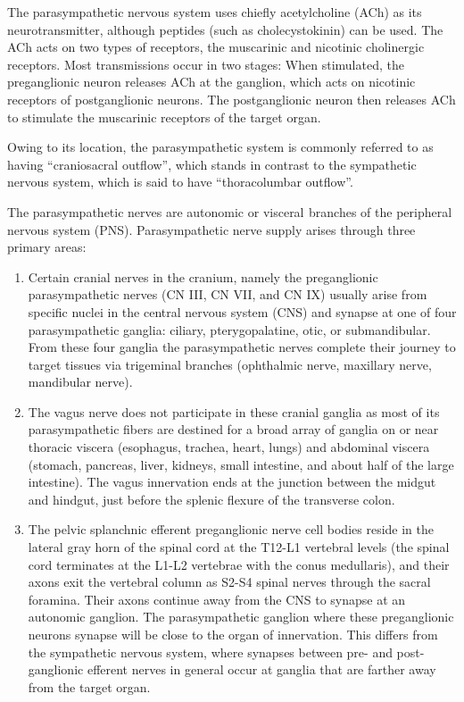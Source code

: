 The parasympathetic nervous system uses chiefly acetylcholine (ACh) as its neurotransmitter, although peptides (such as cholecystokinin) can be used. The ACh acts on two types of receptors, the muscarinic and nicotinic cholinergic receptors. Most transmissions occur in two stages: When stimulated, the preganglionic neuron releases ACh at the ganglion, which acts on nicotinic receptors of postganglionic neurons. The postganglionic neuron then releases ACh to stimulate the muscarinic receptors of the target organ.

Owing to its location, the parasympathetic system is commonly referred to as having ``craniosacral outflow'', which stands in contrast to the sympathetic nervous system, which is said to have ``thoracolumbar outflow''.

The parasympathetic nerves are autonomic or visceral  branches of the peripheral nervous system (PNS). Parasympathetic nerve supply arises through three primary areas:

\begin{enumerate}
\def\labelenumi{\arabic{enumi}.}
\tightlist
\item
  Certain cranial nerves in the cranium, namely the preganglionic parasympathetic nerves (CN III, CN VII, and CN IX) usually arise from specific nuclei in the central nervous system (CNS) and synapse at one of four parasympathetic ganglia: ciliary, pterygopalatine, otic, or submandibular. From these four ganglia the parasympathetic nerves complete their journey to target tissues via trigeminal branches (ophthalmic nerve, maxillary nerve, mandibular nerve).
\item
  The vagus nerve does not participate in these cranial ganglia as most of its parasympathetic fibers are destined for a broad array of ganglia on or near thoracic viscera (esophagus, trachea, heart, lungs) and abdominal viscera (stomach, pancreas, liver, kidneys, small intestine, and about half of the large intestine). The vagus innervation ends at the junction between the midgut and hindgut, just before the splenic flexure of the transverse colon.
\item
  The pelvic splanchnic efferent preganglionic nerve cell bodies reside in the lateral gray horn of the spinal cord at the T12-L1 vertebral levels (the spinal cord terminates at the L1-L2 vertebrae with the conus medullaris), and their axons exit the vertebral column as S2-S4 spinal nerves through the sacral foramina. Their axons continue away from the CNS to synapse at an autonomic ganglion. The parasympathetic ganglion where these preganglionic neurons synapse will be close to the organ of innervation. This differs from the sympathetic nervous system, where synapses between pre- and post-ganglionic efferent nerves in general occur at ganglia that are farther away from the target organ.
\end{enumerate}

